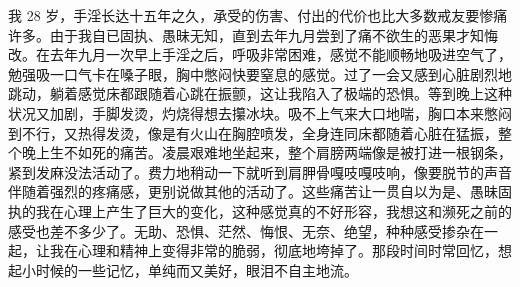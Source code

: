 \begin{case}
    我 28 岁，手淫长达十五年之久，承受的伤害、付出的代价也比大多数戒友要惨痛许多。由于我自已固执、愚昧无知，直到去年九月尝到了痛不欲生的恶果才知悔改。在去年九月一次早上手淫之后，呼吸非常困难，感觉不能顺畅地吸进空气了，勉强吸一口气卡在嗓子眼，胸中憋闷快要窒息的感觉。过了一会又感到心脏剧烈地跳动，躺着感觉床都跟随着心跳在振颤，这让我陷入了极端的恐惧。等到晚上这种状况又加剧，手脚发烫，灼烧得想去攥冰块。吸不上气来大口地喘，胸口本来憋闷到不行，又热得发烫，像是有火山在胸腔喷发，全身连同床都随着心脏在猛振，整个晚上生不如死的痛苦。凌晨艰难地坐起来，整个肩膀两端像是被打进一根钢条，紧到发麻没法活动了。费力地稍动一下就听到肩胛骨嘎吱嘎吱响，像要脱节的声音伴随着强烈的疼痛感，更别说做其他的活动了。这些痛苦让一贯自以为是、愚昧固执的我在心理上产生了巨大的变化，这种感觉真的不好形容，我想这和濒死之前的感受也差不多少了。无助、恐惧、茫然、悔恨、无奈、绝望，种种感受掺杂在一起，让我在心理和精神上变得非常的脆弱，彻底地垮掉了。那段时间时常回忆，想起小时候的一些记忆，单纯而又美好，眼泪不自主地流。

\end{case}
